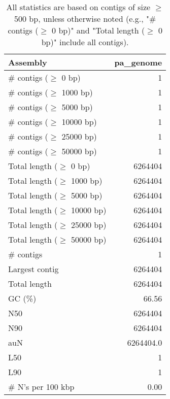 \documentclass[12pt,a4paper]{article}
\begin{document}
\begin{table}[ht]
\begin{center}
\caption{All statistics are based on contigs of size $\geq$ 500 bp, unless otherwise noted (e.g., "\# contigs ($\geq$ 0 bp)" and "Total length ($\geq$ 0 bp)" include all contigs).}
\begin{tabular}{|l*{1}{|r}|}
\hline
Assembly & pa\_genome \\ \hline
\# contigs ($\geq$ 0 bp) & 1 \\ \hline
\# contigs ($\geq$ 1000 bp) & 1 \\ \hline
\# contigs ($\geq$ 5000 bp) & 1 \\ \hline
\# contigs ($\geq$ 10000 bp) & 1 \\ \hline
\# contigs ($\geq$ 25000 bp) & 1 \\ \hline
\# contigs ($\geq$ 50000 bp) & 1 \\ \hline
Total length ($\geq$ 0 bp) & 6264404 \\ \hline
Total length ($\geq$ 1000 bp) & 6264404 \\ \hline
Total length ($\geq$ 5000 bp) & 6264404 \\ \hline
Total length ($\geq$ 10000 bp) & 6264404 \\ \hline
Total length ($\geq$ 25000 bp) & 6264404 \\ \hline
Total length ($\geq$ 50000 bp) & 6264404 \\ \hline
\# contigs & 1 \\ \hline
Largest contig & 6264404 \\ \hline
Total length & 6264404 \\ \hline
GC (\%) & 66.56 \\ \hline
N50 & 6264404 \\ \hline
N90 & 6264404 \\ \hline
auN & 6264404.0 \\ \hline
L50 & 1 \\ \hline
L90 & 1 \\ \hline
\# N's per 100 kbp & 0.00 \\ \hline
\end{tabular}
\end{center}
\end{table}
\end{document}
